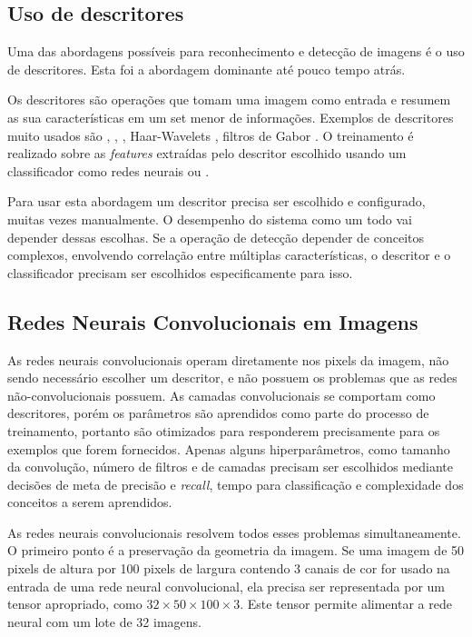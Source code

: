 \subsection{Uso de descritores}
Uma das abordagens possíveis para reconhecimento e detecção de imagens é o uso
de descritores. Esta foi a abordagem dominante até pouco tempo atrás.

Os descritores são operações que tomam uma imagem como entrada e resumem as sua
características em um set menor de informações. Exemplos de descritores muito
usados são
	\cite{wang1990texture},
 \cite{rublee2011orb},
 \cite{dalal2005histograms},
Haar-Wavelets \cite{nabout2008object},
filtros de Gabor \cite{riaz2012invariant}.
O treinamento é realizado sobre
as \emph{features} extraídas pelo descritor escolhido usando um
classificador como redes neurais ou .

Para usar esta abordagem um descritor precisa ser escolhido e configurado,
muitas vezes manualmente. O desempenho do sistema como um todo vai depender
dessas escolhas. Se a operação de detecção depender de conceitos complexos,
envolvendo correlação entre múltiplas características, o descritor e o
classificador precisam ser escolhidos especificamente para isso.

\subsection{Redes Neurais Convolucionais em Imagens}
As redes neurais convolucionais operam diretamente nos pixels da imagem, não
sendo necessário escolher um descritor, e não possuem os problemas que as
redes não-convolucionais possuem. As camadas convolucionais se comportam como
descritores, porém os parâmetros são aprendidos como parte do processo de
treinamento, portanto são otimizados para responderem precisamente para os
exemplos que forem fornecidos. Apenas alguns hiperparâmetros, como tamanho
da convolução, número de filtros e de camadas precisam ser escolhidos mediante
decisões de meta de precisão e \emph{recall}, tempo para classificação e
complexidade dos conceitos a serem aprendidos.

As redes neurais convolucionais resolvem todos esses problemas simultaneamente.
O primeiro ponto é a preservação da geometria da imagem. Se uma imagem de 50
pixels de altura por 100 pixels de largura contendo 3 canais de cor for usado na
entrada de uma rede neural convolucional, ela precisa ser representada por um
tensor apropriado, como $32 \times 50 \times 100 \times 3$. Este tensor
permite alimentar a rede neural com um lote de 32 imagens.

